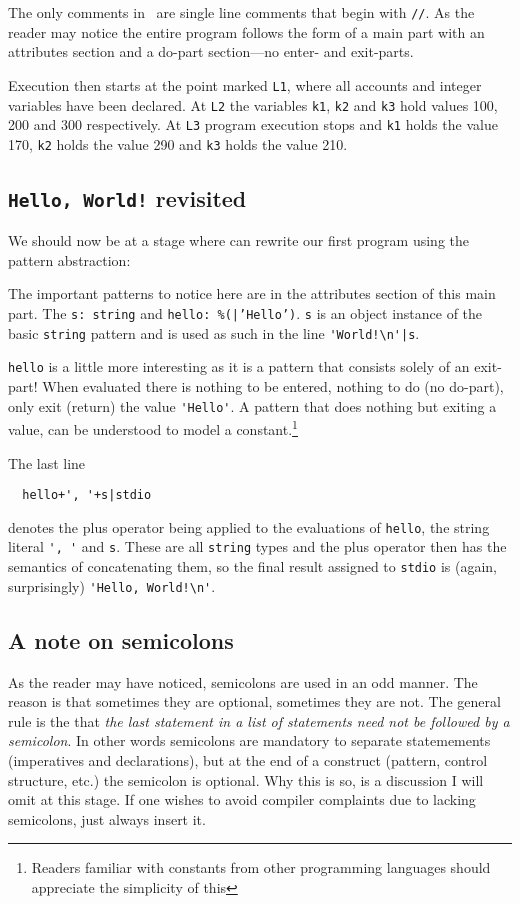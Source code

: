 

The only comments in \gbeta\ are single line comments that begin with
\verb|//|. As the reader may notice the entire program follows the
form of a main part with an attributes section and a do-part
section---no enter- and exit-parts.

Execution then starts at the point marked \texttt{L1}, where all
accounts and integer variables have been declared. At \texttt{L2} the
variables \texttt{k1}, \texttt{k2} and \texttt{k3} hold values 100,
200 and 300 respectively. At \texttt{L3} program execution stops and
\texttt{k1} holds the value 170, \texttt{k2} holds the value 290 and
\texttt{k3} holds the value 210.

\subsection*{\texttt{Hello, World!} revisited}
We should now be at a stage where can rewrite our first program using
the pattern abstraction:



The important patterns to notice here are in the attributes section of
this main part. The \texttt{s: string} and \texttt{hello:
  \%(|'Hello')}. \texttt{s} is an object instance of the basic
\texttt{string} pattern and is used as such in the line
\verb$'World!\n'|s$.

\texttt{hello} is a little more interesting as it
is a pattern that consists solely of an exit-part! When evaluated
there is nothing to be entered, nothing to do (no do-part), only exit
(return) the value \verb|'Hello'|. A pattern that does nothing but
exiting a value, can be understood to model a constant.\footnote{Readers
  familiar with constants from other programming languages should
  appreciate the simplicity of this}

The last line
\begin{verbatim}
  hello+', '+s|stdio
\end{verbatim}
denotes the plus operator being applied to the evaluations of
\texttt{hello}, the string literal \verb|', '| and \texttt{s}. These
are all \texttt{string} types and the plus operator then has the
semantics of concatenating them, so the final result assigned
to \texttt{stdio} is (again, surprisingly) \verb|'Hello, World!\n'|.
\subsection*{A note on semicolons}
As the reader may have noticed, semicolons are used in an odd
manner. The reason is that sometimes they are optional, sometimes they
are not. The general rule is the that \emph{the last statement in a
  list of statements need not be followed by a semicolon}. In other words
semicolons are mandatory to separate statemements (imperatives and
declarations), but at the end of a construct (pattern, control
structure, etc.) the semicolon is optional. Why this is so, is a
discussion I will omit at this stage. If one wishes to avoid compiler
complaints due to lacking semicolons, just always insert it.


